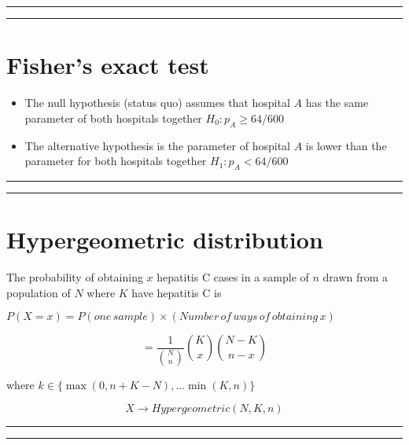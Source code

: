 \documentclass[
]{book}
\begin{document}
\begin{center}\rule{0.5\linewidth}{0.5pt}\end{center}

\begin{center}\rule{0.5\linewidth}{0.5pt}\end{center}

\hypertarget{fishers-exact-test-1}{%
\section{Fisher's exact test}\label{fishers-exact-test-1}}

\begin{itemize}
\item
  The null hypothesis (status quo) assumes that hospital \(A\) has the same parameter of both hospitals together \(H_0: p_A \geq 64/600\)
\item
  The alternative hypothesis is the parameter of hospital \(A\) is lower than the parameter for both hospitals together \(H_1: p_A < 64/600\)
\end{itemize}

\begin{center}\rule{0.5\linewidth}{0.5pt}\end{center}

\begin{center}\rule{0.5\linewidth}{0.5pt}\end{center}

\hypertarget{hypergeometric-distribution}{%
\section{Hypergeometric distribution}\label{hypergeometric-distribution}}

The probability of obtaining \(x\) hepatitis C cases in a sample of \(n\) drawn from a population of \(N\) where \(K\) have hepatitis C is

\(P(X=x)=P(one\,sample) \times (Number\, of\, ways\, of\, obtaining\, x)\)

\[=\frac{1}{\binom N n}\binom K x \binom {N-K} {n-x}\]

where \(k \in \{\max(0, n+K-N), ... \min(K, n) \}\)

\[X \rightarrow Hypergeometric(N,K,n)\]

\begin{center}\rule{0.5\linewidth}{0.5pt}\end{center}

\begin{center}\rule{0.5\linewidth}{0.5pt}\end{center}
\end{document}

